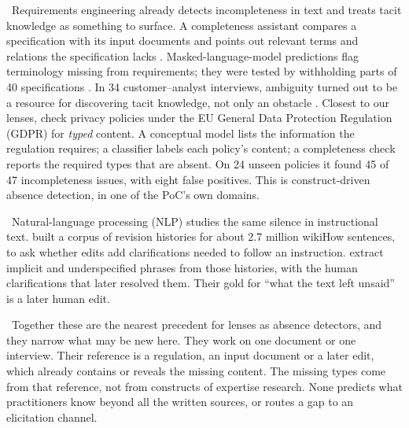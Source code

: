 \evlit\ Requirements engineering already detects incompleteness in text and
treats tacit knowledge as something to surface. A completeness assistant
compares a specification with its input documents and points out relevant
terms and relations the specification lacks \parencite{ferrari2014measuring}.
Masked-language-model predictions flag terminology missing from
requirements; they were tested by withholding parts of 40 specifications
\parencite{luitel2024improving}. In 34 customer--analyst interviews,
ambiguity turned out to be a resource for discovering tacit knowledge, not
only an obstacle \parencite{ferrari2016ambiguity}
\parencite[see also][]{gervasi2013unpacking}. Closest to our lenses,
\textcite{torre2020ai} check privacy policies under the EU General Data Protection
Regulation (GDPR) for \emph{typed} content.
A conceptual model lists the information the regulation requires; a
classifier labels each policy's content; a completeness check reports the
required types that are absent. On 24 unseen policies it found 45 of 47
incompleteness issues, with eight false positives. This is construct-driven
absence detection, in one of the PoC's own domains.

\evlit\ Natural-language processing (NLP) studies the same silence in
instructional text. \textcite{anthonio2020wikihowtoimprove} built a corpus of
revision histories for about 2.7 million wikiHow sentences, to ask whether
edits add clarifications needed to follow an instruction.
\textcite{anthonio2022clarifying} extract implicit and underspecified phrases
from those histories, with the human clarifications that later resolved
them. Their gold for \enquote{what the text left unsaid} is a later human
edit.

\evint\ Together these are the nearest precedent for lenses as absence
detectors, and they narrow what may be new here. They work on one document
or one interview. Their reference is a regulation, an input document or a
later edit, which already contains or reveals the missing content. The
missing types come from that reference, not from constructs of expertise
research. None predicts what practitioners know beyond all the written
sources, or routes a gap to an elicitation channel.


